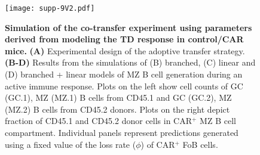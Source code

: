 \documentclass[11pt]{article}
\begin{document}
 
 
\clearpage


\begin{figure}[htbp]
\center
\texttt{[image: supp-9V2.pdf]}
\caption{
    \textbf{Simulation of the co-transfer experiment using parameters derived from modeling the TD response in control/CAR mice.}
    \textbf{(A)} Experimental design of the adoptive transfer strategy.
    \textbf{(B-D)} Results from the simulations of (B) branched, (C) linear and (D) branched + linear models of MZ B cell generation during an active immune response.
    Plots on the left  show cell counts of GC (GC.1), MZ (MZ.1) B cells from CD45.1 and GC (GC.2), MZ (MZ.2) B cells from CD45.2 donors.
    Plots on the right depict fraction of CD45.1 and CD45.2 donor cells in CAR$^+$ MZ B cell compartment.
    Individual panels represent predictions generated using a fixed value of the loss rate ($\phi$) of CAR$^{+}$ FoB cells.
    }
       \label{fig:co-transf}
 \end{figure}
 
\end{document}

